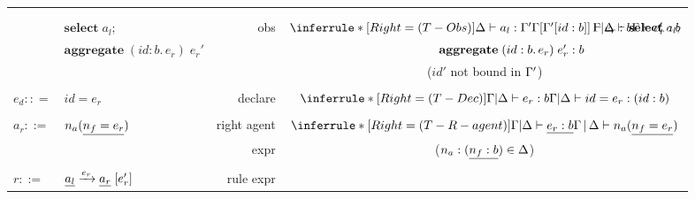 \begin{figure}[!h]
{\begin{tabularx}{1.08\textwidth}{llr|c}
& & & \\
& & & \\
& $\mathbf{select} \; a_l; $ & \textsf{obs} & 
  $\inferrule*[Right=(T-Obs)]{\D \vdash a_l : \G' \\\\ \G[\G'[id:b]] \vdash e_r : b \\ \G \vdash e_r' : b}
  {\hspace{-2.5cm} \G | \D \vdash   \mathbf{select} \; a_l; }$\\
& $ \mathbf{aggregate} \; (id:b.\, e_r) \; e_r'$& & $\hspace{1.55cm} \mathbf{aggregate} \; (id:b.\, e_r) \; e_r' : b$ \\ %
& & & ($id'$ not bound in $\Gamma'$)\\
& & & \\
$e_d :: =$ & $id = e_r$ & \textsf{declare} & $\inferrule*[Right=(T-Dec)]{\G | \D \vdash e_r : b }{\G | \D \vdash id = e_r: (id:b)}$ \\
&&&\\
$a_r::=$ & $n_a(\underline{n_f=e_r})$ &\textsf{right agent} & 
$\inferrule*[Right=(T-R-agent)]{\G|\D \vdash \s{e_r :b}}
{\G \,|\, \D \vdash n_a(\s{n_f=e_r})}$ \\
& & \textsf{expr}& ($ n_a : (\underline{n_f:b}) \in \Delta$)\\
& & & \\
$r ::=$& $\underline{a_l} \xrightarrow{e_r} \underline{a_r} \; [e'_r]$ & \textsf{rule expr} &  

\end{tabularx}}
\end{figure}
